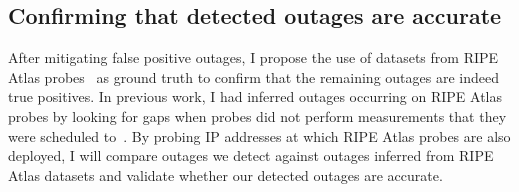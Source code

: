 \subsection{Confirming that detected outages are accurate}

After mitigating false positive outages, I propose the use of datasets
from RIPE Atlas probes~\cite{atlas} as ground truth to confirm that the remaining
outages are indeed true positives. In previous work, I had inferred outages occurring on
RIPE Atlas probes by looking for gaps when probes did not perform 
measurements that they were scheduled to~\cite{addrchange-reasons}. By
probing IP addresses at which RIPE Atlas probes are also deployed, I
will compare outages we detect against outages inferred from RIPE
Atlas datasets and validate whether our detected outages are accurate.